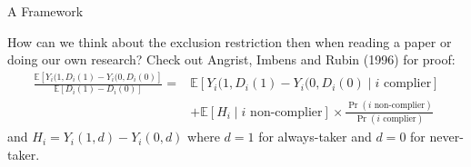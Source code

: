 \begin{frame}{A Framework}

    How can we think about the exclusion restriction then when reading a paper or doing our own research? Check out Angrist, Imbens and Rubin (1996) for proof:
    \begin{align*}
        \frac{\mathbb{E}[Y_i (1, D_i(1) - Y_i(0, D_i(0)]}{\mathbb{E}[D_i(1) - D_i(0)]} = &\mathbb{E}[Y_i (1, D_i(1) - Y_i(0, D_i(0) \mid i \text{ complier}]
        \\
        &+ \mathbb{E}[H_i \mid i \text{ non-complier}] \times \frac{\operatorname{Pr}(i \text{ non-complier})}{\operatorname{Pr}(i \text{ complier})}
    \end{align*}
    and $H_i = Y_i(1, d) - Y_i(0, d)$ where $d = 1$ for always-taker and $d=0$ for never-taker.
\end{frame}